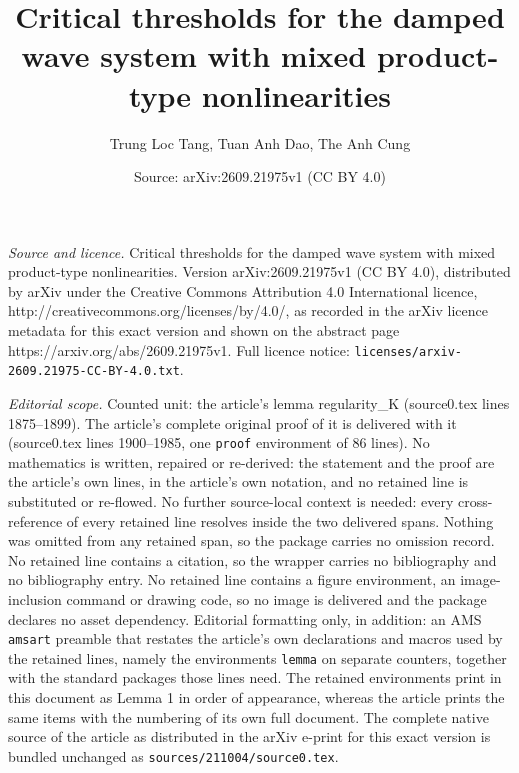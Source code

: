 \documentclass[10pt,a4paper]{amsart}
\title{Critical thresholds for the damped wave system with mixed product-type nonlinearities}
\author{Trung Loc Tang, Tuan Anh Dao, The Anh Cung}
\date{Source: arXiv:2609.21975v1 (CC BY 4.0)}
\begin{document}
\maketitle

\noindent\emph{Source and licence.} Critical thresholds for the damped wave system with mixed product-type nonlinearities. Version arXiv:2609.21975v1 (CC BY 4.0), distributed by arXiv under the Creative Commons Attribution 4.0 International licence, http://creativecommons.org/licenses/by/4.0/, as recorded in the arXiv licence metadata for this exact version and shown on the abstract page https://arxiv.org/abs/2609.21975v1. Full licence notice: \texttt{licenses/arxiv-2609.21975-CC-BY-4.0.txt}.\par\smallskip

\noindent\textit{Editorial scope.} Counted unit: the article's lemma regularity\_K (source0.tex lines 1875--1899). The article's complete original proof of it is delivered with it (source0.tex lines 1900--1985, one \texttt{proof} environment of 86 lines). No mathematics is written, repaired or re-derived: the statement and the proof are the article's own lines, in the article's own notation, and no retained line is substituted or re-flowed.  No further source-local context is needed: every cross-reference of every retained line resolves inside the two delivered spans.  Nothing was omitted from any retained span, so the package carries no omission record.  No retained line contains a citation, so the wrapper carries no bibliography and no bibliography entry.  No retained line contains a figure environment, an image-inclusion command or drawing code, so no image is delivered and the package declares no asset dependency.  Editorial formatting only, in addition: an AMS \texttt{amsart} preamble that restates the article's own declarations and macros used by the retained lines, namely the environments \texttt{lemma} on separate counters, together with the standard packages those lines need.  The retained environments print in this document as Lemma 1 in order of appearance, whereas the article prints the same items with the numbering of its own full document.  The complete native source of the article as distributed in the arXiv e-print for this exact version is bundled unchanged as \texttt{sources/211004/source0.tex}.
\end{document}
